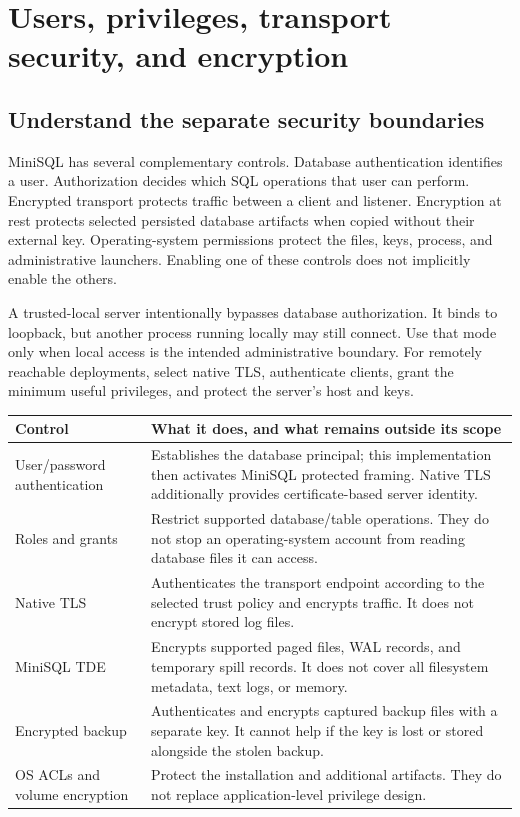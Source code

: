 \chapter{Users, privileges, transport security, and encryption}
\label{ops:security}

\section{Understand the separate security boundaries}

MiniSQL has several complementary controls. Database authentication identifies
a user. Authorization decides which SQL operations that user can perform.
Encrypted transport protects traffic between a client and listener. Encryption
at rest protects selected persisted database artifacts when copied without
their external key. Operating-system permissions protect the files, keys,
process, and administrative launchers. Enabling one of these controls does
not implicitly enable the others.

A trusted-local server intentionally bypasses database authorization. It
binds to loopback, but another process running locally may still connect.
Use that mode only when local access is the intended administrative boundary.
For remotely reachable deployments, select native TLS, authenticate clients,
grant the minimum useful privileges, and protect the server's host and keys.

\begin{longtable}{p{.29\linewidth}p{.64\linewidth}}
\toprule
Control & What it does, and what remains outside its scope \\
\midrule
\endhead
User/password authentication & Establishes the database principal; this implementation then activates MiniSQL protected framing. Native TLS additionally provides certificate-based server identity. \\
Roles and grants & Restrict supported database/table operations. They do not
stop an operating-system account from reading database files it can access. \\
Native TLS & Authenticates the transport endpoint according to the selected
trust policy and encrypts traffic. It does not encrypt stored log files. \\
MiniSQL TDE & Encrypts supported paged files, WAL records, and temporary spill
records. It does not cover all filesystem metadata, text logs, or memory. \\
Encrypted backup & Authenticates and encrypts captured backup files with a
separate key. It cannot help if the key is lost or stored alongside the stolen
backup. \\
OS ACLs and volume encryption & Protect the installation and additional
artifacts. They do not replace application-level privilege design. \\
\bottomrule
\end{longtable}

